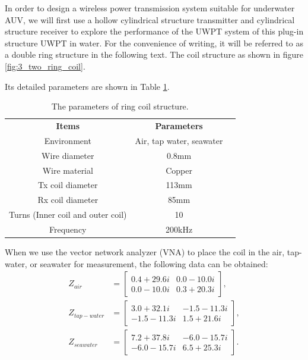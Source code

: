 In order to design a wireless power transmission system suitable for underwater AUV, we will first use a hollow cylindrical structure transmitter and cylindrical structure receiver to explore the performance of the UWPT system of this plug-in structure UWPT in water. For the convenience of writing, it will be referred to as a double ring structure in the following text. The coil structure as shown in figure \ref{fig:3_two_ring_coil}.

Its detailed parameters are shown in Table \ref{table:ring coil parameters}.

\begin{table}[!t]
    \centering
    \caption{The parameters of ring coil structure.}
    \begin{tabular}{ c|cc }
        \thickhline
        \textbf{Items}                    & \textbf{Parameters}      \\
        \thickhline
        Environment                       & Air, tap water, seawater \\ \hline
        Wire diameter                     & 0.8mm                    \\ \hline
        Wire material                     & Copper                   \\
        \hline
        Tx coil diameter                  & 113mm                    \\ \hline
        Rx coil diameter                  & 85mm                     \\ \hline
        Turns (Inner coil and outer coil) & 10                       \\ \hline
        Frequency                         & 200kHz                   \\ \hline
    \end{tabular}
    \label{table:ring coil parameters}
\end{table}

When we use the vector network analyzer (VNA) to place the coil in the air, tap-water, or seawater for measurement, the following data can be obtained:
\begin{equation*}
    \begin{aligned}
        Z_{air}       & =
        \begin{bmatrix}
            0.4 +29.6i & 0.0 -10.0i \\
            0.0 -10.0i & 0.3 +20.3i
        \end{bmatrix}, \\
        Z_{tap-water} & =
        \begin{bmatrix}
            3.0 +32.1i  & -1.5 -11.3i \\
            -1.5 -11.3i & 1.5 +21.6i
        \end{bmatrix}, \\
        Z_{seawater}  & =
        \begin{bmatrix}
            7.2 +37.8i  & -6.0 -15.7i \\
            -6.0 -15.7i & 6.5 +25.3i
        \end{bmatrix}.
    \end{aligned}
\end{equation*}


